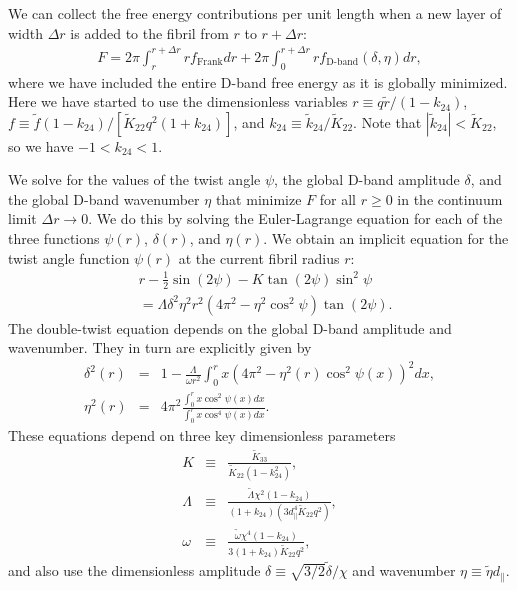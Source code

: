 \documentclass[twoside,twocolumn,9pt]{article}
\begin{document}
We can collect the free energy contributions per unit length when a new layer of width $\Delta r$ is added to the fibril from $r$ to $r+\Delta r$:
\begin{equation}\begin{aligned}
     F  = 2\pi\int_{r}^{r+\Delta r} r  f_\text{Frank}dr  + 2\pi \int_0^{r+\Delta r} r f_\text{D-band}(\delta,\eta) dr,
\end{aligned}\end{equation}
where we have included the entire D-band free energy as it is globally minimized. Here we have started to use the dimensionless variables $r \equiv q\tilde{r}/(1-k_{24})$, $f \equiv \tilde{f}(1-k_{24})/\left[\tilde{K}_{22}q^2(1+k_{24})\right]$, and $k_{24} \equiv \tilde{k}_{24}/\tilde{K}_{22}$. Note that $|\tilde{k}_{24}| < \tilde{K}_{22}$,\cite{Ericksen:1991} so we have  $-1 < k_{24} < 1$.

We solve for the values of the twist angle $\psi$, the global D-band amplitude $\delta$, and the global D-band wavenumber $\eta$ that minimize $F$ for all $r\geq0$ in the continuum limit $\Delta r\to0$. We do this by solving the Euler-Lagrange equation for each of the three functions $\psi(r)$, $\delta(r)$, and $\eta(r)$. We obtain an implicit equation for the twist angle function $\psi(r)$ at the current fibril radius $r$:
\begin{equation}\begin{aligned}\label{psieq}
    & r - \frac{1}{2}\sin(2\psi) - K\tan(2\psi)\sin^2\psi \\
    & = \Lambda\delta^2\eta^2r^2\left(4\pi^2-\eta^2\cos^2\psi\right)\tan(2\psi).
\end{aligned}\end{equation}
The double-twist equation depends on the global D-band amplitude and wavenumber. They in turn are explicitly given by 
\begin{eqnarray}
    \label{deltaeq}
    \delta^2(r)  & = & 1-\frac{\Lambda}{\omega r^2}\int_0^{r}x\left(4\pi^2-\eta^2(r)\cos^2\psi(x)\right)^2dx, \\
    \label{etaeq}
    \eta^2(r) & = & 4\pi^2\frac{ \int_0^{r}x\cos^2\psi(x)dx}{\int_0^{r}x\cos^4\psi(x)dx}.
\end{eqnarray}
These equations depend on three key dimensionless parameters 
\begin{eqnarray}
    K &\equiv& \frac{\tilde{K}_{33}}{\tilde{K}_{22}(1-k_{24}^2)},  \\ 
    \Lambda & \equiv& \frac{\tilde{\Lambda}\chi^2 (1-k_{24})}{ (1+k_{24})(3d_\parallel^4\tilde{K}_{22}q^2)}, \\
    \omega& \equiv&  \frac{\tilde{\omega}\chi^4 (1-k_{24})}{3(1+k_{24}) \tilde{K}_{22}q^2},
\end{eqnarray}
and also use the dimensionless amplitude
$\delta \equiv \sqrt{3/2}\tilde{\delta}/\chi$ and wavenumber $\eta \equiv \tilde{\eta}d_\parallel$.
\end{document}
